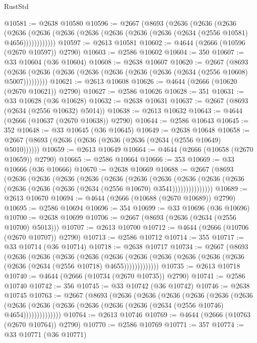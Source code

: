 \begin{lexlean}{RustStd}
\begin{coremodule}
@10581 := @2638 @10580
@10596 := @2667
    (@8693
      (@2636
        (@2636
          (@2636
            (@2636 (@2636 (@2636 (@2636 (@2636 (@2636 (@2636 (@2634 (@2556 @10581) @4656))))))))))))
@10597 := @2613 @10581
@10602 := @4644 (@2666 (@10596 (@2670 @10597)) @2790)
@10603 := @2586 @10602
@10604 := 350
@10607 := @33 @10604 (@36 @10604)
@10608 := @2638 @10607
@10620 := @2667
    (@8693 (@2636 (@2636 (@2636 (@2636 (@2636 (@2636 (@2636 (@2634 (@2556 @10608) @5007)))))))))
@10621 := @2613 @10608
@10626 := @4644 (@2666 (@10620 (@2670 @10621)) @2790)
@10627 := @2586 @10626
@10628 := 351
@10631 := @33 @10628 (@36 @10628)
@10632 := @2638 @10631
@10637 := @2667 (@8693 (@2634 (@2556 @10632) @5014))
@10638 := @2613 @10632
@10643 := @4644 (@2666 (@10637 (@2670 @10638)) @2790)
@10644 := @2586 @10643
@10645 := 352
@10648 := @33 @10645 (@36 @10645)
@10649 := @2638 @10648
@10658 := @2667 (@8693 (@2636 (@2636 (@2636 (@2636 (@2634 (@2556 @10649) @5010))))))
@10659 := @2613 @10649
@10664 := @4644 (@2666 (@10658 (@2670 @10659)) @2790)
@10665 := @2586 @10664
@10666 := 353
@10669 := @33 @10666 (@36 @10666)
@10670 := @2638 @10669
@10688 := @2667
    (@8693
      (@2636
        (@2636
          (@2636
            (@2636
              (@2636
                (@2636
                  (@2636
                    (@2636
                      (@2636 (@2636 (@2636 (@2636 (@2636 (@2634 (@2556 @10670) @3541)))))))))))))))
@10689 := @2613 @10670
@10694 := @4644 (@2666 (@10688 (@2670 @10689)) @2790)
@10695 := @2586 @10694
@10696 := 354
@10699 := @33 @10696 (@36 @10696)
@10700 := @2638 @10699
@10706 := @2667 (@8693 (@2636 (@2634 (@2556 @10700) @5013)))
@10707 := @2613 @10700
@10712 := @4644 (@2666 (@10706 (@2670 @10707)) @2790)
@10713 := @2586 @10712
@10714 := 355
@10717 := @33 @10714 (@36 @10714)
@10718 := @2638 @10717
@10734 := @2667
    (@8693
      (@2636
        (@2636
          (@2636
            (@2636
              (@2636
                (@2636 (@2636 (@2636 (@2636 (@2636 (@2636 (@2634 (@2556 @10718) @4655)))))))))))))
@10735 := @2613 @10718
@10740 := @4644 (@2666 (@10734 (@2670 @10735)) @2790)
@10741 := @2586 @10740
@10742 := 356
@10745 := @33 @10742 (@36 @10742)
@10746 := @2638 @10745
@10763 := @2667
    (@8693
      (@2636
        (@2636
          (@2636
            (@2636
              (@2636
                (@2636
                  (@2636
                    (@2636 (@2636 (@2636 (@2636 (@2636 (@2634 (@2556 @10746) @4654))))))))))))))
@10764 := @2613 @10746
@10769 := @4644 (@2666 (@10763 (@2670 @10764)) @2790)
@10770 := @2586 @10769
@10771 := 357
@10774 := @33 @10771 (@36 @10771)

\end{coremodule}
\end{lexlean}
